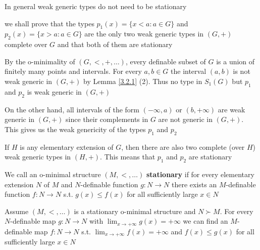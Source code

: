 \documentclass[11pt]{article}
\begin{document}
In general weak generic types do not need to be stationary

\begin{examplle}[]
we shall prove that the types \(p_1(x)=\{x<a:a\in G\}\) and \(p_2(x)=\{x>a:a\in G\}\) are the only two
weak generic types in \((G,+)\) complete over \(G\) and that both of them are stationary

By the o-minimality of \((G,<,+,\dots)\), every definable subset of \(G\) is a union of finitely
many points and intervals. For every \(a,b\in G\) the interval \((a,b)\) is not weak generic
in \((G,+)\) by Lemma \ref{3.2.1} (2). Thus no type in \(S_1(G)\) but \(p_1\) and \(p_2\) is weak
generic in \((G,+)\)

On the other hand, all intervals of the form \((-\infty,a)\) or \((b,+\infty)\) are weak generic
in \((G,+)\) since their complements in \(G\) are not generic in \((G,+)\).  This gives us the
weak genericity of the types \(p_1\) and \(p_2\)

If \(H\) is any elementary extension of \(G\), then there are also two complete (over \(H\))
weak generic types in \((H,+)\). This means that \(p_1\) and \(p_2\) are stationary
\end{examplle}

\begin{definition}[]
We call an o-minimal structure \((M,<,\dots)\) \textbf{stationary} if for every elementary extension \(N\)
of \(M\) and \(N\)-definable function \(g:N\to N\) there exists an \(M\)-definable
function \(f:N\to N\) s.t. \(g(x)\le f(x)\) for all sufficiently large \(x\in N\)
\end{definition}

\begin{theorem}[]
\label{3.4.4}
Assume \((M,<,\dots)\) is a stationary o-minimal structure and \(N\succ M\). For every \(N\)-definable
map \(g:N\to N\) with \(\lim_{x\to+\infty}g(x)=+\infty\)  we can find an \(M\)-definable map \(f:N\to N\)
s.t. \(\lim_{x\to+\infty}f(x)=+\infty\) and \(f(x)\le g(x)\) for all sufficiently large \(x\in N\)
\end{theorem}
\end{document}
